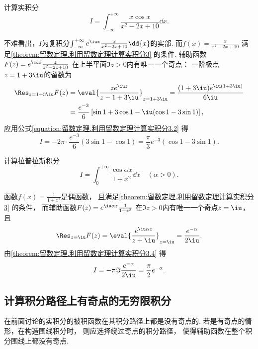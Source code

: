 \begin{example}
计算实积分\[
	I = \int_{-\infty}^{+\infty} \frac{x \cos x}{x^2-2x+10} \dd{x}.
\]
\begin{solution}
不难看出，\(I\)为复积分\(\int_{-\infty}^{+\infty} e^{\iu x} \frac{x}{x^2-2x+10} \dd{x}\)的实部.
而\(f(x) = \frac{x}{x^2-2x+10}\)
满足\cref{theorem:留数定理.利用留数定理计算实积分3} 的条件.
辅助函数\(F(z) = e^{\iu z} \frac{z}{z^2-2z+10}\)
在上半平面\(\Im z > 0\)内有唯一一个奇点：
一阶极点\(z=1+3\iu\)的留数为\begin{align*}
	\Res_{z=1+3\iu} F(z)
	&= \eval{\frac{z e^{\iu z}}{z-1+3\iu}}_{z=1+3\iu}
		= \frac{(1+3\iu) e^{\iu(1+3\iu)}}{6\iu} \\
	&= \frac{e^{-3}}{6} \left[ \sin1+3\cos1-\iu(\cos1-3\sin1)\right],
\end{align*}
应用公式\cref{equation:留数定理.利用留数定理计算实积分3.2} 得\[
	I = -2\pi \cdot \frac{e^{-3}}{6} (3\sin1-\cos1)
	= \frac{\pi}{3} e^{-3} (\cos1-3\sin1).
\]
\end{solution}
\end{example}

\begin{example}
计算拉普拉斯积分\[
	I = \int_0^{+\infty} \frac{\cos \alpha x}{1+x^2} \dd{x} \quad(\alpha>0).
\]
\begin{solution}
函数\(f(x) = \frac{1}{1+x^2}\)是偶函数，
且满足\cref{theorem:留数定理.利用留数定理计算实积分3} 的条件，
而辅助函数\(F(z) = e^{\iu\alpha z} \frac{1}{1+z^2}\)
在\(\Im z > 0\)内有唯一一个奇点\(z=\iu\)，
且\[
	\Res_{z=\iu} F(z) = \eval{\frac{e^{\iu\alpha z}}{z+\iu}}_{z=\iu}
	= \frac{e^{-\alpha}}{2\iu}.
\]
由\cref{theorem:留数定理.利用留数定理计算实积分3.4} 得\[
	I = -\pi \Im \frac{e^{-\alpha}}{2\iu}
	= \frac{\pi}{2} e^{-\alpha}.
\]
\end{solution}
\end{example}

\subsection{计算积分路径上有奇点的无穷限积分}
在前面讨论的实积分的被积函数在其积分路径上都是没有奇点的.
若是有奇点的情形，在构造围线积分时，
则应选择绕过奇点的积分路径，
使得辅助函数在整个积分围线上都没有奇点.


